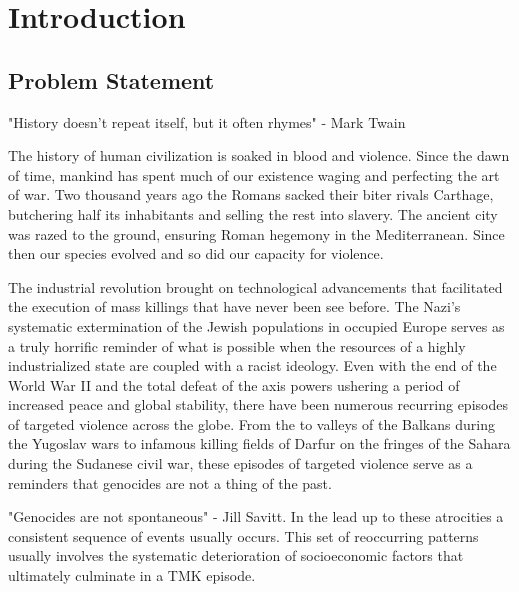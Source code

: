 \chapter{Introduction}\label{ch:intro}

\section{Problem Statement}
"History doesn't repeat itself, but it often rhymes" - Mark Twain

The history of human civilization is soaked in blood and violence. Since the dawn of time, mankind has spent much of our existence waging and perfecting the art of war. Two thousand years ago the Romans sacked their biter rivals Carthage, butchering half its inhabitants and selling the rest into slavery. The ancient city was razed to the ground, ensuring Roman hegemony in the Mediterranean. Since then our species evolved and so did our capacity for violence.

The industrial revolution brought on technological advancements that facilitated the execution of mass killings that have never been see before. The Nazi's systematic extermination of the Jewish populations in occupied Europe serves as a truly horrific reminder of what is possible when the resources of a highly industrialized state are coupled with a racist ideology. Even with the end of the World War II and the total defeat of the axis powers ushering a period of increased peace and global stability, there have been numerous recurring episodes of targeted violence across the globe. From the to valleys of the Balkans during the Yugoslav wars to infamous killing fields of Darfur on the fringes of the Sahara during the Sudanese civil war, these episodes of targeted violence serve as a reminders that genocides are not a thing of the past. 

"Genocides are not spontaneous" - Jill Savitt. In the lead up to these atrocities a consistent sequence of events usually occurs. This set of reoccurring patterns usually involves the systematic deterioration of socioeconomic factors that ultimately culminate in a TMK episode. 




